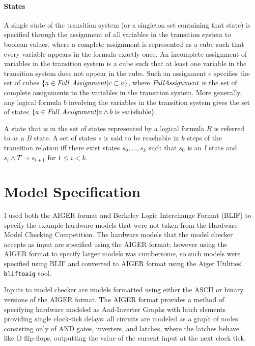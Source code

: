 \documentclass[12pt,a4paper,twoside,openright]{report}
\begin{document}
\paragraph{States}{
A single state of the transition system (or a singleton set containing that state)
is specified through the assignment of all variables in the transition system
to boolean values, where a complete assignment is represented as a cube such
that every variable appears in the formula exactly once.
An incomplete assignment of variables in the transition system is a cube such that
at least one variable in the transition system does not appear in the cube. Such an
assignment $c$ specifies the set of cubes $\{a \in{\it Full~Assignment}|c \subset a\}$,
where ${\it Full Assignment}$ is the set of complete assignments to the variables in the
transition system.
More generally, any logical formula $b$ involving the variables in the transition
system gives the set of states
$\{a \in {\it Full~Assignment} | a \wedge b~{\rm is~satisfiable}\}$.

A state that is in the set of states represented by a logical formula $B$ is referred to
as a $B$ state. A set of states $s$ is said to be reachable
in $k$ steps of the transition relation iff there exist states $s_0, \ldots, s_k$ such that
$s_0$ is an $I$ state and $s_i \wedge T \Rightarrow s_{i + 1}$ for $1 \leq i < k$.

}


\section{Model Specification}


I used both the AIGER format and Berkeley Logic Interchange Format (BLIF)
to specify the example hardware models that were not taken from the
Hardware Model Checking Competition.
The hardware models that the model checker accepts as input
are specified using the AIGER format;
however using the AIGER format to specify larger models was cumbersome,
so such models were specified using BLIF and converted to AIGER format
using the Aiger Utilities' \verb,bliftoaig, tool.

Inputs to model checker are models formatted using either the ASCII or
binary versions of the AIGER format.
The AIGER format provides a method of specifying hardware modeled as
And-Inverter Graphs with latch elements providing single clock-tick
delays: all circuits are modeled as a graph of nodes consisting only of
AND gates, inverters, and latches, where the latches behave like D
flip-flops, outputting the value of the current input at the next
clock tick.
\end{document}

